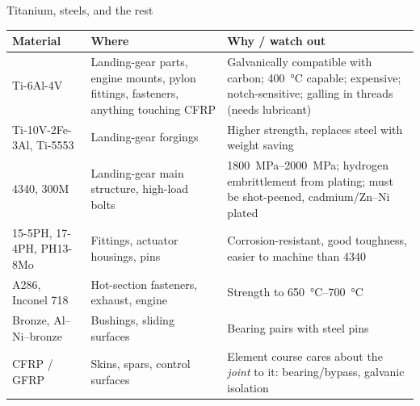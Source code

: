 \documentclass[aspectratio=169,10pt]{beamer}
\begin{document}
\begin{frame}{Titanium, steels, and the rest}
\scriptsize
\begin{tabular}{@{}p{2.4cm}p{5.6cm}p{6.2cm}@{}}
\toprule
Material & Where & Why / watch out \\
\midrule
Ti-6Al-4V & Landing-gear parts, engine mounts, pylon fittings, fasteners, anything touching CFRP & Galvanically compatible with carbon; \SI{400}{\celsius} capable; expensive; notch-sensitive; galling in threads (needs lubricant) \\
Ti-10V-2Fe-3Al, Ti-5553 & Landing-gear forgings & Higher strength, replaces steel with weight saving \\
4340, 300M & Landing-gear main structure, high-load bolts & \SIrange{1800}{2000}{MPa}; hydrogen embrittlement from plating; must be shot-peened, cadmium/Zn--Ni plated \\
15-5PH, 17-4PH, PH13-8Mo & Fittings, actuator housings, pins & Corrosion-resistant, good toughness, easier to machine than 4340 \\
A286, Inconel 718 & Hot-section fasteners, exhaust, engine & Strength to \SIrange{650}{700}{\celsius} \\
Bronze, Al--Ni--bronze & Bushings, sliding surfaces & Bearing pairs with steel pins \\
CFRP / GFRP & Skins, spars, control surfaces & Element course cares about the \emph{joint} to it: bearing/bypass, galvanic isolation \\
\bottomrule
\end{tabular}
\end{frame}
\end{document}
